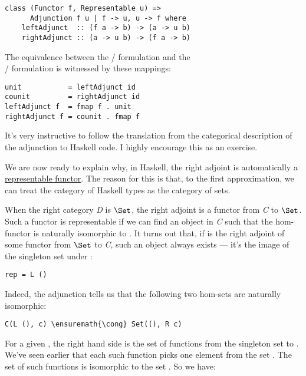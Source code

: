 \begin{Verbatim}[commandchars=\\\{\}]
class (Functor f, Representable u) => 
      Adjunction f u | f -> u, u -> f where
    leftAdjunct  :: (f a -> b) -> (a -> u b)
    rightAdjunct :: (a -> u b) -> (f a -> b) 
\end{Verbatim}
The equivalence between the / formulation
and the\\ / formulation is
witnessed by these mappings:

\begin{Verbatim}[commandchars=\\\{\}]
unit           = leftAdjunct id
counit         = rightAdjunct id
leftAdjunct f  = fmap f . unit
rightAdjunct f = counit . fmap f 
\end{Verbatim}
It's very instructive to follow the translation from the categorical
description of the adjunction to Haskell code. I highly encourage this
as an exercise.

We are now ready to explain why, in Haskell, the right adjoint is
automatically a \hyperref[chap-representable-functors]{representable
functor}. The reason for this is that, to the first approximation, we
can treat the category of Haskell types as the category of sets.

When the right category \emph{D} is $\Set$, the right adjoint
 is a functor from \emph{C} to $\Set$. Such a functor is
representable if we can find an object  in \emph{C} such
that the hom-functor  is naturally isomorphic to
. It turns out that, if  is the right adjoint of
some functor  from $\Set$ to \emph{C}, such an object
always exists --- it's the image of the singleton set \code{()} under
:

\begin{Verbatim}[commandchars=\\\{\}]
rep = L ()
\end{Verbatim}
Indeed, the adjunction tells us that the following two hom-sets are
naturally isomorphic:

\begin{Verbatim}[commandchars=\\\{\}]
C(L (), c) \ensuremath{\cong} Set((), R c)
\end{Verbatim}
For a given , the right hand side is the set of functions from
the singleton set \code{()} to . We've seen earlier that
each such function picks one element from the set . The set
of such functions is isomorphic to the set . So we have:

